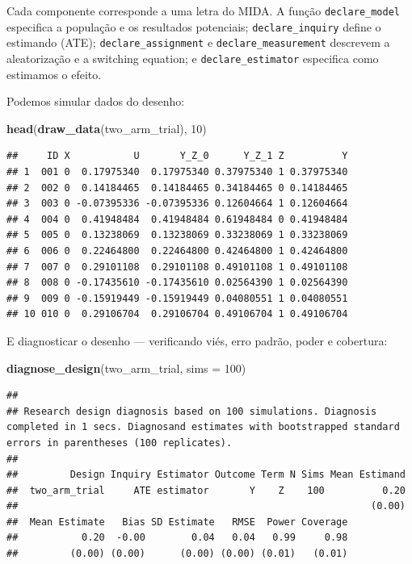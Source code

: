 \documentclass[
]{article}
\newenvironment{Shaded}{\begin{snugshade}}{\end{snugshade}}
\newcommand{\AttributeTok}[1]{\textcolor[rgb]{0.13,0.29,0.53}{#1}}
\newcommand{\DecValTok}[1]{\textcolor[rgb]{0.00,0.00,0.81}{#1}}
\newcommand{\FunctionTok}[1]{\textcolor[rgb]{0.13,0.29,0.53}{\textbf{#1}}}
\newcommand{\NormalTok}[1]{#1}
\begin{document}
Cada componente corresponde a uma letra do MIDA. A função \texttt{declare\_model} especifica a população e os resultados potenciais; \texttt{declare\_inquiry} define o estimando (ATE); \texttt{declare\_assignment} e \texttt{declare\_measurement} descrevem a aleatorização e a switching equation; e \texttt{declare\_estimator} especifica como estimamos o efeito.

Podemos simular dados do desenho:

\begin{Shaded}
\begin{Highlighting}[]
\FunctionTok{head}\NormalTok{(}\FunctionTok{draw\_data}\NormalTok{(two\_arm\_trial), }\DecValTok{10}\NormalTok{)}
\end{Highlighting}
\end{Shaded}

\begin{verbatim}
##     ID X           U       Y_Z_0      Y_Z_1 Z          Y
## 1  001 0  0.17975340  0.17975340 0.37975340 1 0.37975340
## 2  002 0  0.14184465  0.14184465 0.34184465 0 0.14184465
## 3  003 0 -0.07395336 -0.07395336 0.12604664 1 0.12604664
## 4  004 0  0.41948484  0.41948484 0.61948484 0 0.41948484
## 5  005 0  0.13238069  0.13238069 0.33238069 1 0.33238069
## 6  006 0  0.22464800  0.22464800 0.42464800 1 0.42464800
## 7  007 0  0.29101108  0.29101108 0.49101108 1 0.49101108
## 8  008 0 -0.17435610 -0.17435610 0.02564390 1 0.02564390
## 9  009 0 -0.15919449 -0.15919449 0.04080551 1 0.04080551
## 10 010 0  0.29106704  0.29106704 0.49106704 1 0.49106704
\end{verbatim}

E diagnosticar o desenho --- verificando viés, erro padrão, poder e cobertura:

\begin{Shaded}
\begin{Highlighting}[]
\FunctionTok{diagnose\_design}\NormalTok{(two\_arm\_trial, }\AttributeTok{sims =} \DecValTok{100}\NormalTok{)}
\end{Highlighting}
\end{Shaded}

\begin{verbatim}
## 
## Research design diagnosis based on 100 simulations. Diagnosis completed in 1 secs. Diagnosand estimates with bootstrapped standard errors in parentheses (100 replicates).
## 
##         Design Inquiry Estimator Outcome Term N Sims Mean Estimand
##  two_arm_trial     ATE estimator       Y    Z    100          0.20
##                                                             (0.00)
##  Mean Estimate   Bias SD Estimate   RMSE  Power Coverage
##           0.20  -0.00        0.04   0.04   0.99     0.98
##         (0.00) (0.00)      (0.00) (0.00) (0.01)   (0.01)
\end{verbatim}
\end{document}
